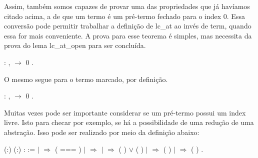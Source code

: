 Assim, também somos capazes de provar uma das propriedades que já havíamos citado acima, a de que um termo é um pré-termo
fechado para o index 0. Essa conversão pode permitir trabalhar a definição de lc\_at ao invés de term, quando essa for mais conveniente. A
prova para esse teorema é simples, mas necessita da prova do lema lc\_at\_open para ser concluída.\begin{coqdoccode}
\coqdocemptyline
\coqdocnoindent
{}  : \coqdockw{\ensuremath{\forall}} ,   \ensuremath{\rightarrow}  0 .\coqdoceol
\coqdocemptyline
\coqdocemptyline
\end{coqdoccode}
O mesmo segue para o termo marcado, por definição. \begin{coqdoccode}
\coqdocemptyline
\coqdocnoindent
{}  : \coqdockw{\ensuremath{\forall}} ,   \ensuremath{\rightarrow}  0 .\coqdoceol
\coqdocemptyline
\coqdocemptyline
\coqdocemptyline
\coqdocemptyline
\end{coqdoccode}
Muitas vezes pode ser importante considerar se um pré-termo possui um index livre. Isto para checar
por exemplo, se há a possibilidade de uma redução de uma abstração. Isso pode ser realizado por meio da definição abaixo:\begin{coqdoccode}
\coqdocemptyline
\coqdocnoindent
{}  (:) (:) :  :=\coqdoceol
\coqdocindent{1.00em}
  \coqdoceol
\coqdocindent{2.00em}
\ensuremath{|}   \ensuremath{\Rightarrow}  ( === )    \coqdoceol
\coqdocindent{2.00em}
\ensuremath{|}   \ensuremath{\Rightarrow} \coqdoceol
\coqdocindent{2.00em}
\ensuremath{|}    \ensuremath{\Rightarrow} (  ) \ensuremath{\lor} (  )\coqdoceol
\coqdocindent{2.00em}
\ensuremath{|}   \ensuremath{\Rightarrow}  ( ) \coqdoceol
\coqdocindent{2.00em}
\ensuremath{|}   \ensuremath{\Rightarrow}  ( ) \coqdoceol
\coqdocindent{1.00em}
.\coqdoceol
\coqdocemptyline
\coqdocemptyline
\end{coqdoccode}
